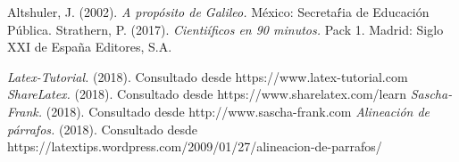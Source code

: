 \documentclass[letterpaper, 10pt, journal]{IEEEtran}
\begin{document}
\begin{thebibliography}{1}
\bibitem{[1]} Altshuler, J. (2002). \emph{A prop\'osito de Galileo.} M\'exico: Secretar\'́ia de Educaci\'on P\'ublica.
\bibitem{[2]} Strathern, P. (2017). \emph{Cienti\'ificos en 90 minutos.} Pack 1. Madrid: Siglo XXI de España Editores, S.A. 

 \emph{Latex-Tutorial.} (2018). Consultado desde https://www.latex-tutorial.com
 \emph{ShareLatex.} (2018). Consultado desde https://www.sharelatex.com/learn
 \emph{Sascha-Frank.} (2018). Consultado desde http://www.sascha-frank.com
\bibitem{[7]} \emph{Alineación de párrafos.} (2018). Consultado desde https://latextips.wordpress.com/2009/01/27/alineacion-de-parrafos/

\end{thebibliography}
\end{document}
